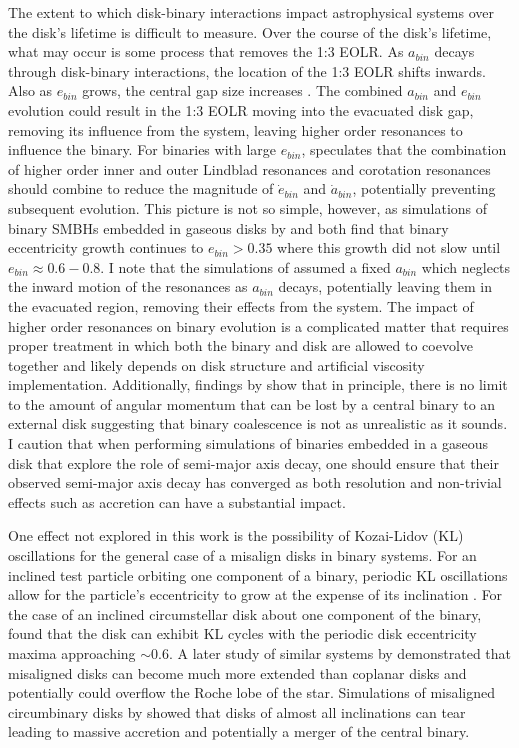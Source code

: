 The extent to which disk-binary interactions impact astrophysical systems over the disk's lifetime is difficult to measure.  Over the course of the disk's 
lifetime, what may occur is some process that removes the 1:3 EOLR.  As $a_{bin}$ decays through disk-binary interactions, the location of the 
1:3 EOLR shifts inwards.  Also as $e_{bin}$ grows, the central gap size increases \citep{Artymowicz1994}.  The combined $a_{bin}$ and $e_{bin}$ evolution could result 
in the 1:3 EOLR moving into the evacuated disk gap, removing its influence from the system, leaving higher order resonances to influence the binary.  For 
binaries with large $e_{bin}$, \citet{Artymowicz1991} speculates that the combination of higher order inner and outer Lindblad resonances and corotation resonances 
should combine to reduce the magnitude of $\dot{e}_{bin}$ and $\dot{a}_{bin}$, potentially preventing subsequent evolution.  This picture is not so 
simple, however, as simulations of binary SMBHs embedded in gaseous disks by \citet{Cuadra2009} and \citet{Roedig2011} both find that binary eccentricity growth 
continues to $e_{bin} > 0.35$ where this growth did not slow until $e_{bin} \approx 0.6-0.8$.  I note that the simulations of \citet{Roedig2011} assumed a fixed 
$a_{bin}$ which neglects the inward motion of the resonances as $a_{bin}$ decays, potentially leaving them in the evacuated region, removing their effects 
from the system.  The impact of higher order resonances on binary evolution is a complicated matter that requires proper treatment in which both the binary and 
disk are allowed to coevolve together and likely depends on disk structure and artificial viscosity implementation.  Additionally, findings by \citet{Pringle1991} show 
that in principle, there is no limit to the amount of angular momentum that can be lost by a central binary to an external disk suggesting that binary coalescence 
is not as unrealistic as it sounds.   I caution that when performing simulations of binaries embedded in a gaseous disk that explore the role of semi-major axis decay, one should ensure that their observed semi-major axis decay has converged as both resolution and non-trivial effects such as accretion \citep[e.g.][]{Roedig2012} can have a substantial impact.

One effect not explored in this work is the possibility of Kozai-Lidov (KL) oscillations for the general case of a misalign disks in binary systems.   
For an inclined test particle orbiting one component of a binary, periodic KL oscillations 
allow for the particle's eccentricity to grow at the expense of its inclination \citet{Kozai1962,Lidov1962}.  For the case of an inclined circumstellar disk about one 
component of the binary, \citet{Martin2014CB} found that the disk can exhibit KL cycles with the periodic disk eccentricity maxima approaching $\sim 0.6$.  A 
later study of similar systems by \citet{Lubow2015} demonstrated that misaligned disks can become much more extended than coplanar disks and 
potentially could overflow the Roche lobe of the star.  Simulations of misaligned circumbinary disks by \citet{Nixon2013} showed that disks of almost all 
inclinations can tear leading to massive accretion and potentially a merger of the central binary.

